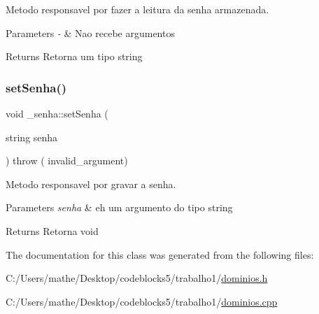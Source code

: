 Metodo responsavel por fazer a leitura da senha armazenada. 


\begin{DoxyParams}{Parameters}
{\em -\/} & Nao recebe argumentos \\
\hline
\end{DoxyParams}
\begin{DoxyReturn}{Returns}
Retorna um tipo string 
\end{DoxyReturn}
\mbox{\label{class__senha_a5104da5b8a8b68cfeb0fb64823f5f053}} 
\subsubsection{\texorpdfstring{setSenha()}{setSenha()}}
{\footnotesize\ttfamily void \+\_\+senha\+::set\+Senha (\begin{DoxyParamCaption}\item[{string}]{senha }\end{DoxyParamCaption}) throw ( invalid\+\_\+argument) }



Metodo responsavel por gravar a senha. 


\begin{DoxyParams}{Parameters}
{\em senha} & eh um argumento do tipo string \\
\hline
\end{DoxyParams}
\begin{DoxyReturn}{Returns}
Retorna void 
\end{DoxyReturn}


The documentation for this class was generated from the following files\+:\begin{DoxyCompactItemize}
\item 
C\+:/\+Users/mathe/\+Desktop/codeblocks5/trabalho1/\mbox{\hyperlink{dominios_8h}{dominios.\+h}}\item 
C\+:/\+Users/mathe/\+Desktop/codeblocks5/trabalho1/\mbox{\hyperlink{dominios_8cpp}{dominios.\+cpp}}\end{DoxyCompactItemize}
